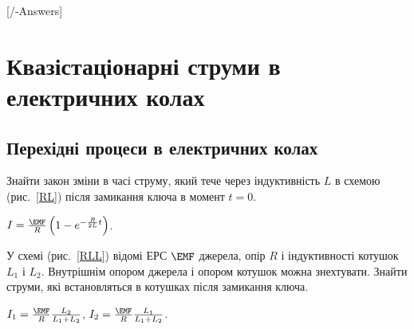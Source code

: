 
[\currfilebase/\currfilebase-Answers]
\chapter{Квазістаціонарні струми в електричних колах}\label{\currfilebase}

\section{Перехідні процеси в електричних колах}

\begin{problem}\label{prb:RL}%
Знайти закон зміни в часі струму, який тече через індуктивність $L$ в схемою (рис.~\ref{RL}) після замикання ключа  в момент $t = 0$.
\begin{solution}
	$I = \frac{\EMF}{R}\left( 1-e^{-\frac{R}{2L}t}\right) $.
\end{solution}
\end{problem}

\begin{problem}\label{prb:RLL}%
У схемі (рис.~\ref{RLL}) відомі ЕРС $\EMF$ джерела, опір $R$ і індуктивності котушок $L_1$ і $L_2$. Внутрішнім опором джерела і опором котушок можна знехтувати. Знайти струми, які встановляться в котушках після замикання ключа.
\begin{solution}
	$I_1 = \frac{\EMF}{R} \frac{L_2}{L_1 + L_2}$, $I_2 = \frac{\EMF}{R} \frac{L_1}{L_1 + L_2}$.
\end{solution}
\end{problem}


